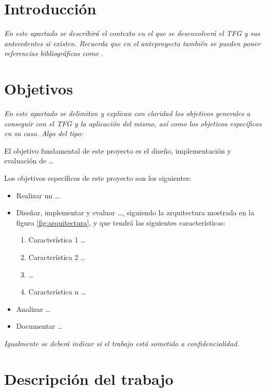 \documentclass[11pt,a4paper,oneside]{article}
\begin{document}
\section{Introducción}
\label{sec:introduccion}

\textit{En este apartado se describirá el contexto en el que se desenvolverá el
  TFG y sus antecedentes si existen. Recuerda que en el anteproyecto
  también se pueden poner referencias bibliográficas como \cite{moore2002}}.


\section{Objetivos}
\label{sec:objetivos-y-campo}

\textit{En este apartado se delimitan y explican con claridad los objetivos
  generales a conseguir con el TFG y la aplicación del mismo, así como los
  objetivos específicos en su caso. Algo del tipo:}

El objetivo fundamental de este proyecto es el diseño, implementación y
evaluación de \ldots

Los objetivos específicos de este proyecto son los siguientes:

\begin{itemize}
\item Realizar un  \ldots
\item Diseñar, implementar y evaluar  \ldots, siguiendo la arquitectura
  mostrada en la figura \ref{fig:arquitectura}, y que tendrá las
  siguientes características:

  \begin{enumerate}
  \item Característica 1 \ldots
  \item Característica 2 \ldots
  \item  \ldots
  \item Característica n \ldots
  \end{enumerate}

\item Analizar  \ldots

\item Documentar  \ldots

\end{itemize}

\textit{Igualmente se deberá indicar si el trabajo está sometido a confidencialidad.}

\section{Descripción del trabajo}
\label{sec:descr-del-trab}
\end{document}
